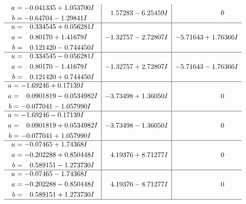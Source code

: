\documentclass[1p]{elsarticle_modified}
\theoremstyle{definition}
\begin{document}
$$\begin{array}{c|c|c}
\begin{aligned}
a &= -0.041335 + 1.053700 I \\
b &= -0.64704 - 1.29841 I\end{aligned}
 & \phantom{-}1.57283 - 6.25459 I & \phantom{-0.000000 } 0 \\ \hline\begin{aligned}
u &= \phantom{-}0.334545 + 0.056281 I \\
a &= \phantom{-}0.80170 + 1.41679 I \\
b &= \phantom{-}0.121420 - 0.744450 I\end{aligned}
 & -1.32757 - 2.72807 I & -5.71643 + 1.76366 I \\ \hline\begin{aligned}
u &= \phantom{-}0.334545 - 0.056281 I \\
a &= \phantom{-}0.80170 - 1.41679 I \\
b &= \phantom{-}0.121420 + 0.744450 I\end{aligned}
 & -1.32757 + 2.72807 I & -5.71643 - 1.76366 I \\ \hline\begin{aligned}
u &= -1.69246 + 0.17139 I \\
a &= \phantom{-}0.0901819 - 0.0534982 I \\
b &= -0.077041 - 1.057990 I\end{aligned}
 & -3.73498 + 1.36050 I & \phantom{-0.000000 } 0 \\ \hline\begin{aligned}
u &= -1.69246 - 0.17139 I \\
a &= \phantom{-}0.0901819 + 0.0534982 I \\
b &= -0.077041 + 1.057990 I\end{aligned}
 & -3.73498 - 1.36050 I & \phantom{-0.000000 } 0 \\ \hline\begin{aligned}
u &= -0.07465 + 1.74368 I \\
a &= -0.202288 + 0.850448 I \\
b &= \phantom{-}0.589151 - 1.273730 I\end{aligned}
 & \phantom{-}4.19376 + 8.71277 I & \phantom{-0.000000 } 0 \\ \hline\begin{aligned}
u &= -0.07465 - 1.74368 I \\
a &= -0.202288 - 0.850448 I \\
b &= \phantom{-}0.589151 + 1.273730 I\end{aligned}
 & \phantom{-}4.19376 - 8.71277 I & \phantom{-0.000000 } 0\\
 \hline 
 \end{array}$$\newpage\newpage\renewcommand{\arraystretch}{1}
\end{document}

